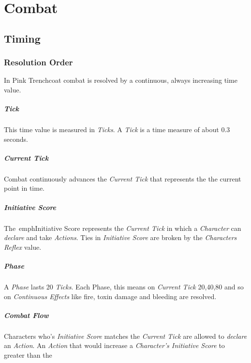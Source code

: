 \chapter{Combat}

\section{Timing}

\subsection{Resolution Order}

In Pink Trenchcoat combat is resolved by a continuous, always increasing
time value.

\paragraph{Tick}
This time value is measured in \emph{Ticks}. A \emph{Tick} is
a time measure of about 0.3 seconds.

\paragraph{Current Tick}
Combat continuously advances the \emph{Current Tick} that represents the the current
point in time.

\paragraph{Initiative Score}
The\ emph{Initiative Score} represents the \emph{Current Tick} in which a
\emph{Character} can \emph{declare} and take \emph{Actions}.
Ties in \emph{Initiative Score} are broken by the \emph{Characters Reflex} value.

\paragraph{Phase}
A \emph{Phase} lasts 20 \emph{Ticks}. Each Phase, this means on \emph{Current Tick }
20,40,80 and so on \emph{Continuous Effects} like fire,
toxin damage and bleeding are resolved.

\paragraph{Combat Flow}
\label{par:maximum initiative score}
Characters who's \emph{Initiative Score} matches the \emph{Current Tick}
are allowed to \emph{declare} an \emph{Action}. An \emph{Action} that would
increase a \emph{Character's Initiative Score} to greater than the


